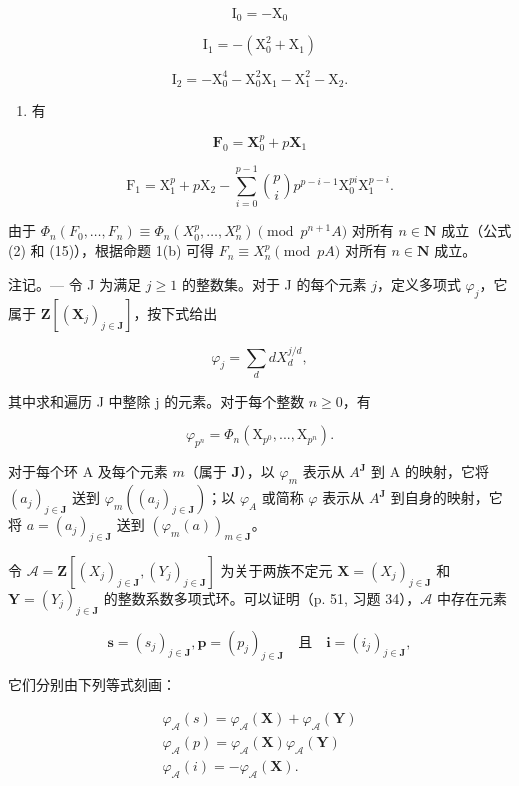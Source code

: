 \[
\mathrm{I} _ {0} = - \mathrm{X} _ {0}
\]

\[
\mathrm{I} _ {1} = - \left(\mathrm{X} _ {0} ^ {2} + \mathrm{X} _ {1}\right)
\]

\[
\mathrm{I} _ {2} = - \mathrm{X} _ {0} ^ {4} - \mathrm{X} _ {0} ^ {2} \mathrm{X} _ {1} - \mathrm{X} _ {1} ^ {2} - \mathrm{X} _ {2}.
\]

\begin{enumerate}
\def\labelenumi{\arabic{enumi})}
\setcounter{enumi}{3}
\tightlist
\item
  有
\end{enumerate}

\[
\mathbf {F} _ {0} = \mathbf {X} _ {0} ^ {p} + p \mathbf {X} _ {1}
\]

\[
\mathrm{F} _ {1} = \mathrm{X} _ {1} ^ {p} + p \mathrm{X} _ {2} - \sum_ {i = 0} ^ {p - 1} \binom {p} {i} p ^ {p - i - 1} \mathrm{X} _ {0} ^ {p i} \mathrm{X} _ {1} ^ {p - i}.
\]

  由于 \(\Phi_n(F_0, \ldots, F_n) \equiv \Phi_n(X_0^p, \ldots, X_n^p) \pmod{p^{n+1}A}\) 对所有 \(n \in \mathbf{N}\) 成立（公式 (2) 和 (15)），根据命题 1(b) 可得 \(F_n \equiv X_n^p \pmod{pA}\) 对所有 \(n \in \mathbf{N}\) 成立。

 注记。--- 令 J 为满足 \(j \geqslant 1\) 的整数集。对于 J 的每个元素 \(j\)，定义多项式 \(\varphi_j\)，它属于 \(\mathbf{Z}[(\mathbf{X}_j)_{j \in \mathbf{J}}]\)，按下式给出

\[
\varphi_ {j} = \sum_ {d} d X _ {d} ^ {j / d},
\]

其中求和遍历 J 中整除 j 的元素。对于每个整数 \(n \geqslant 0\)，有

\[
\varphi_ {p ^ {n}} = \Phi_ {n} (\mathrm{X} _ {p ^ {0}},..., \mathrm{X} _ {p ^ {n}}).
\]

对于每个环 A 及每个元素 \(m\)（属于 \(\mathbf{J}\)），以 \(\varphi_{m}\) 表示从 \(A^{\mathbf{J}}\) 到 A 的映射，它将 \((a_{j})_{j\in\mathbf{J}}\) 送到 \(\varphi_{m}((a_{j})_{j\in\mathbf{J}})\)；以 \(\varphi_{A}\) 或简称 \(\varphi\) 表示从 \(A^{\mathbf{J}}\) 到自身的映射，它将 \(a = (a_{j})_{j\in\mathbf{J}}\) 送到 \((\varphi_{m}(a))_{m\in\mathbf{J}}\)。

令 \(\mathcal{A} = \mathbf{Z}[(X_j)_{j\in\mathbf{J}},(Y_j)_{j\in\mathbf{J}}]\) 为关于两族不定元 \(\mathbf{X} = (X_j)_{j\in\mathbf{J}}\) 和 \(\mathbf{Y} = (Y_j)_{j\in\mathbf{J}}\) 的整数系数多项式环。可以证明（p. 51, 习题 34），\(\mathcal{A}\) 中存在元素

\[
\boldsymbol {s} = (s _ {j}) _ {j \in \mathbf {J}}, \boldsymbol {p} = (p _ {j}) _ {j \in \mathbf {J}} \quad \text{且} \quad \boldsymbol {i} = (i _ {j}) _ {j \in \mathbf {J}},
\]

它们分别由下列等式刻画：

\[
\begin{array}{l} \varphi_ {\mathcal {A}} (s) = \varphi_ {\mathcal {A}} (\mathbf {X}) + \varphi_ {\mathcal {A}} (\mathbf {Y}) \\ \varphi_ {\mathcal {A}} (p) = \varphi_ {\mathcal {A}} (\mathbf {X}) \varphi_ {\mathcal {A}} (\mathbf {Y}) \\ \varphi_ {\mathcal {A}} (i) = - \varphi_ {\mathcal {A}} (\mathbf {X}). \end{array}
\]

